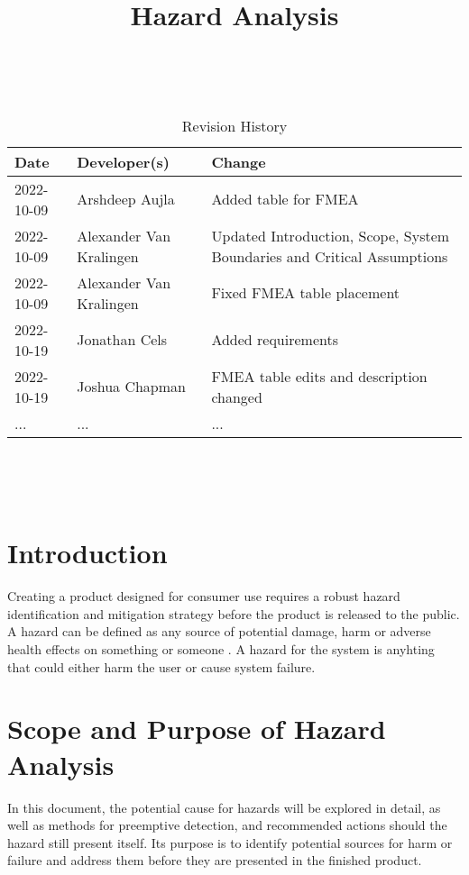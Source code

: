 \documentclass{article}
\title{Hazard Analysis\\\progname}
\author{\authname}
\date{}
\begin{document}
\maketitle
\thispagestyle{empty}

~\newpage


\begin{table}[hp]
\caption{Revision History} \label{TblRevisionHistory}
\begin{tabularx}{\textwidth}{llX}
\toprule
\textbf{Date} & \textbf{Developer(s)} & \textbf{Change}\\
\midrule
2022-10-09 & Arshdeep Aujla & Added table for FMEA\\
2022-10-09 & Alexander Van Kralingen & Updated Introduction, Scope, System Boundaries and Critical Assumptions\\
2022-10-09 & Alexander Van Kralingen & Fixed FMEA table placement\\
2022-10-19 & Jonathan Cels & Added requirements\\
2022-10-19 & Joshua Chapman & FMEA table edits and description changed\\
... & ... & ...\\
\bottomrule
\end{tabularx}
\end{table}

~\newpage

\tableofcontents

~\newpage



\section{Introduction}{
    Creating a product designed for consumer use requires a robust hazard identification and mitigation strategy before the product is released to the public. A hazard can be defined as any source of potential damage, harm or adverse health effects on something or someone \cite{CCOHS}. A hazard for the \progname{} system is anyhting that could either harm the user or cause system failure.
}

\section{Scope and Purpose of Hazard Analysis}{
    In this document, the potential cause for hazards will be explored in detail, as well as methods for preemptive detection, and recommended actions should the hazard still present itself. Its purpose is to identify potential sources for harm or failure and address them before they are presented in the finished product.
}
\end{document}
